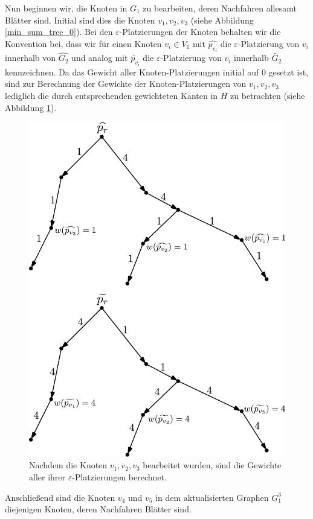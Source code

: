 \documentclass[a4paper, 12pt, twoside]{article}
\theoremstyle{Format1} %
\begin{document}
Nun beginnen wir, die Knoten in $G_1$ zu bearbeiten, deren Nachfahren allesamt Blätter sind. Initial sind dies die Knoten $v_1, v_2, v_3$ (siehe Abbildung \ref{min_sum_tree_0}).
Bei den $\varepsilon$-Platzierungen der Knoten behalten wir die Konvention bei, dass wir für einen Knoten $v_i \in V_1$ mit $\widehat{p_{v_i}}$ die $\varepsilon$-Platzierung von $v_i$ innerhalb
von $\widehat{G_2}$ und analog mit $\widetilde{p_{v_i}}$ die $\varepsilon$-Platzierung von $v_i$ innerhalb $\widetilde{G_2}$ kennzeichnen. Da das Gewicht aller Knoten-Platzierungen initial auf 0 gesetzt ist,
sind zur Berechnung der Gewichte der Knoten-Platzierungen von $v_1,v_2,v_3$ lediglich die durch entsprechenden gewichteten Kanten in $H$ zu betrachten (siehe Abbildung \ref{min_sum_tree_iteration_0}).

\begin{figure}[H]
	\centering
	\includegraphics[width=0.8\linewidth]{min_sum_tree_h_0.pdf}
	\caption{
		Nachdem die Knoten $v_1,v_2,v_3$ bearbeitet wurden, sind die Gewichte aller ihrer $\varepsilon$-Platzierungen berechnet.
	}
	\label{min_sum_tree_iteration_0}
\end{figure}

Anschließend sind die Knoten $v_4$ und $v_5$ in dem aktualisierten Graphen $G_1^3$ diejenigen Knoten, deren Nachfahren Blätter sind.
\end{document}

